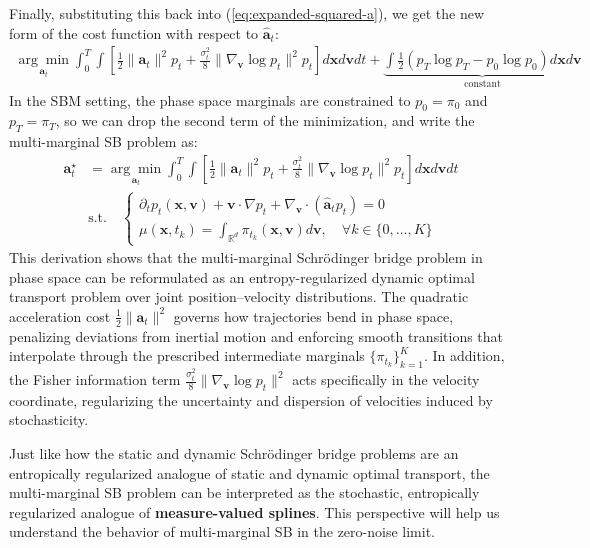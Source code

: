 \documentclass{article}
\newcommand{\boldtext}[1]{\textbf{\textcolor{MyGreen}{#1}}}
\begin{document}
Finally, substituting this back into (\ref{eq:expanded-squared-a}), we get the new form of the cost function with respect to $\hat{\boldsymbol{a}}_t$:
\begin{align}
    \underset{\boldsymbol{a}_t}{\arg\min}\int_0^T\int \left[\frac{1}{2}\|\boldsymbol{a}_t\|^2 p_t+\frac{\sigma^2_t}{8}\|\nabla_{\boldsymbol{v}}\log p_t\|^2p_t\right]d\boldsymbol{x}d\boldsymbol{v}dt+\underbrace{\int \frac{1}{2}\left(p_T\log p_T-p_0\log p_0\right)d\boldsymbol{x}d\boldsymbol{v}}_{\text{constant}}
\end{align}
In the SBM setting, the phase space marginals are constrained to $p_0=\pi_0$ and $p_T=\pi_T$, so we can drop the second term of the minimization, and write the multi-marginal SB problem as: 
\begin{align}
    \boldsymbol{a}^\star_t&=\underset{\boldsymbol{a}_t}{\arg\min}\int_0^T\int \left[\frac{1}{2}\|\boldsymbol{a}_t\|^2 p_t+\frac{\sigma^2_t}{8}\|\nabla_{\boldsymbol{v}}\log p_t\|^2p_t\right]d\boldsymbol{x}d\boldsymbol{v}dt\\ &\text{s.t.}\quad \begin{cases}
            \partial_tp_t(\boldsymbol{x},\boldsymbol{v})+\boldsymbol{v}\cdot \nabla p_t+\nabla_{\boldsymbol{v}}\cdot (\hat{\boldsymbol{a}}_tp_t)=0\\
            \mu(\boldsymbol{x}, t_k)=\int_{\mathbb{R}^d}\pi_{t_k}(\boldsymbol{x}, \boldsymbol{v})d\boldsymbol{v}, \quad \forall k\in \{0, \dots, K\}
        \end{cases}\label{eq:mmsb-fpe-final}
\end{align}
This derivation shows that the multi-marginal Schrödinger bridge problem in phase space can be reformulated as an entropy-regularized dynamic optimal transport problem over joint position–velocity distributions. The quadratic acceleration cost $\frac{1}{2}\|\boldsymbol{a}_t\|^2 $ governs how trajectories bend in phase space, penalizing deviations from inertial motion and enforcing smooth transitions that interpolate through the prescribed intermediate marginals $\{\pi_{t_k}\}_{k=1}^K$. In addition, the Fisher information term $\frac{\sigma_t^2}{8}\|\nabla_{\boldsymbol{v}}\log p_t\|^2$ acts specifically in the velocity coordinate, regularizing the uncertainty and dispersion of velocities induced by stochasticity.

Just like how the static and dynamic Schrödinger bridge problems are an entropically regularized analogue of static and dynamic optimal transport, the multi-marginal SB problem can be interpreted as the stochastic, entropically regularized analogue of \boldtext{measure-valued splines}. This perspective will help us understand the behavior of multi-marginal SB in the zero-noise limit. 
\end{document}
